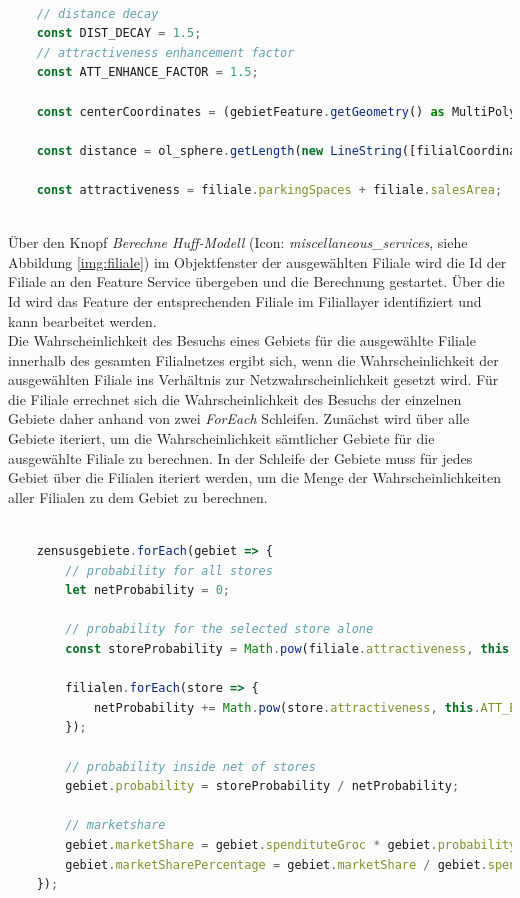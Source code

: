\begin{lstlisting}[language=JavaScript]
	
	// distance decay
	const DIST_DECAY = 1.5;
	// attractiveness enhancement factor
	const ATT_ENHANCE_FACTOR = 1.5;
	
	const centerCoordinates = (gebietFeature.getGeometry() as MultiPolygon).getInteriorPoints().getFirstCoordinate();
	
	const distance = ol_sphere.getLength(new LineString([filialCoordinates, centerCoordinates]), {projection: 'EPSG:3857'});
	
	const attractiveness = filiale.parkingSpaces + filiale.salesArea;
	
\end{lstlisting}

Über den Knopf \emph{Berechne Huff-Modell} (Icon: \emph{miscellaneous\_services}, siehe Abbildung \ref{img:filiale}) im Objektfenster der ausgewählten Filiale wird die Id der Filiale an den Feature Service übergeben und die Berechnung gestartet.
Über die Id wird das Feature der entsprechenden Filiale im Filiallayer identifiziert und kann bearbeitet werden.\\
Die Wahrscheinlichkeit des Besuchs eines Gebiets für die ausgewählte Filiale innerhalb des gesamten Filialnetzes ergibt sich, wenn die Wahrscheinlichkeit der ausgewählten Filiale ins Verhältnis zur Netzwahrscheinlichkeit gesetzt wird.
Für die Filiale errechnet sich die Wahrscheinlichkeit des Besuchs der einzelnen Gebiete daher anhand von zwei \emph{ForEach} Schleifen.
Zunächst wird über alle Gebiete iteriert, um die Wahrscheinlichkeit sämtlicher Gebiete für die ausgewählte Filiale zu berechnen.
In der Schleife der Gebiete muss für jedes Gebiet über die Filialen iteriert werden, um die Menge der Wahrscheinlichkeiten aller Filialen zu dem Gebiet zu berechnen.

\begin{lstlisting}[language=JavaScript]
	
	zensusgebiete.forEach(gebiet => {
		// probability for all stores
		let netProbability = 0;
		
		// probability for the selected store alone
		const storeProbability = Math.pow(filiale.attractiveness, this.ATT_ENHANCE_FACTOR) / Math.pow(distance, this.DIST_DECAY);
		
		filialen.forEach(store => {
			netProbability += Math.pow(store.attractiveness, this.ATT_ENHANCE_FACTOR) / Math.pow(this.calculateDistancesForFiliale(store.coordinates, gebiet.coordinates), this.DIST_DECAY);
		});
	
		// probability inside net of stores
		gebiet.probability = storeProbability / netProbability;

		// marketshare
		gebiet.marketShare = gebiet.spendituteGroc * gebiet.probability;
		gebiet.marketSharePercentage = gebiet.marketShare / gebiet.spendituteGroc;
	});
\end{lstlisting}

